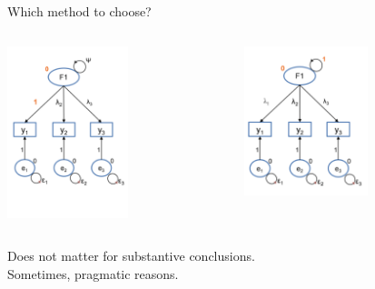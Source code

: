 \documentclass[10pt]{beamer}\usepackage[]{graphicx}\usepackage[]{xcolor}
\begin{document}
\begin{frame}{Which method to choose?}


\begin{columns}[T] %
    \begin{column}{.49\textwidth}
    
    {}
    \includegraphics[height=5cm,keepaspectratio]{images/slide56.png}
    
    \end{column}%
    
    \hfill%
    \begin{column}{.49\textwidth}
    
    {}
        \includegraphics[height=4.35cm,keepaspectratio]{images/slide60.png}
    \end{column}%
    
    \end{columns}
    
Does not matter for substantive conclusions.\\
Sometimes, pragmatic reasons. 

\end{frame}
%
\end{document}
